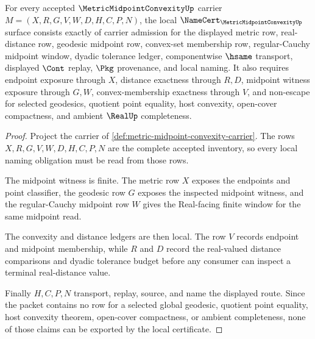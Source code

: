 \begin{theorem}
\label{thm:metric-midpoint-convexity-namecert-obligations}
For every accepted $\MetricMidpointConvexityUp$ carrier $M=(X,R,G,V,W,D,H,C,P,N)$, the local $\NameCert_{\MetricMidpointConvexityUp}$ surface consists exactly of carrier admission for the displayed metric row, real-distance row, geodesic midpoint row, convex-set membership row, regular-Cauchy midpoint window, dyadic tolerance ledger, componentwise $\hsame$ transport, displayed $\Cont$ replay, $\Pkg$ provenance, and local naming. It also requires endpoint exposure through $X$, distance exactness through $R,D$, midpoint witness exposure through $G,W$, convex-membership exactness through $V$, and non-escape for selected geodesics, quotient point equality, host convexity, open-cover compactness, and ambient $\RealUp$ completeness.
\end{theorem}
\begin{proof}
Project the carrier of \autoref{def:metric-midpoint-convexity-carrier}. The rows $X,R,G,V,W,D,H,C,P,N$ are the complete accepted inventory, so every local naming obligation must be read from those rows.

The midpoint witness is finite. The metric row $X$ exposes the endpoints and point classifier, the geodesic row $G$ exposes the inspected midpoint witness, and the regular-Cauchy midpoint row $W$ gives the Real-facing finite window for the same midpoint read.

The convexity and distance ledgers are then local. The row $V$ records endpoint and midpoint membership, while $R$ and $D$ record the real-valued distance comparisons and dyadic tolerance budget before any consumer can inspect a terminal real-distance value.

Finally $H,C,P,N$ transport, replay, source, and name the displayed route. Since the packet contains no row for a selected global geodesic, quotient point equality, host convexity theorem, open-cover compactness, or ambient completeness, none of those claims can be exported by the local certificate.
\end{proof}



